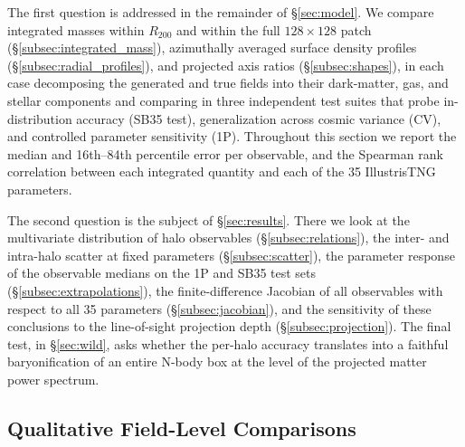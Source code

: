 \documentclass[linenumbers,trackchanges, twocolumn]{aastex701}
\begin{document}
The first question is addressed in the remainder of \S\ref{sec:model}. We compare integrated masses within $R_{200}$ and within the full $128\times128$ patch (\S\ref{subsec:integrated_mass}), azimuthally averaged surface density profiles (\S\ref{subsec:radial_profiles}), and projected axis ratios (\S\ref{subsec:shapes}), in each case decomposing the generated and true fields into their dark-matter, gas, and stellar components and comparing in three independent test suites that probe in-distribution accuracy (SB35 test), generalization across cosmic variance (CV), and controlled parameter sensitivity (1P). Throughout this section we report the median and 16th--84th percentile error per observable, and the Spearman rank correlation between each integrated quantity and each of the 35 IllustrisTNG parameters.

The second question is the subject of \S\ref{sec:results}. There we look at the multivariate distribution of halo observables (\S\ref{subsec:relations}), the inter- and intra-halo scatter at fixed parameters (\S\ref{subsec:scatter}), the parameter response of the observable medians on the 1P and SB35 test sets (\S\ref{subsec:extrapolations}), the finite-difference Jacobian of all observables with respect to all 35 parameters (\S\ref{subsec:jacobian}), and the sensitivity of these conclusions to the line-of-sight projection depth (\S\ref{subsec:projection}). The final test, in \S\ref{sec:wild}, asks whether the per-halo accuracy translates into a faithful baryonification of an entire N-body box at the level of the projected matter power spectrum.
\subsection{Qualitative Field-Level Comparisons}
\label{subsec:qualitative}
\end{document}
